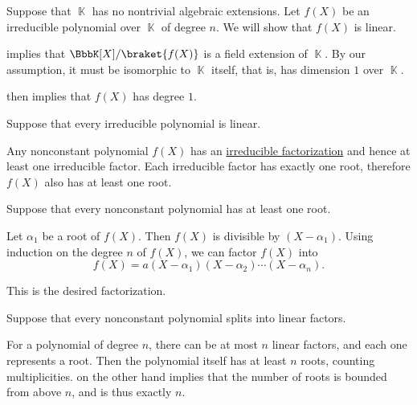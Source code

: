 \begin{defproof}
   Suppose that \( \BbbK \) has no nontrivial algebraic extensions. Let \( f(X) \) be an irreducible polynomial over \( \BbbK \) of degree \( n \). We will show that \( f(X) \) is linear.

   implies that \( \BbbK[X] / \braket{ f(X) } \) is a field extension of \( \BbbK \). By our assumption, it must be isomorphic to \( \BbbK \) itself, that is, has dimension \( 1 \) over \( \BbbK \).

   then implies that \( f(X) \) has degree \( 1 \).

   Suppose that every irreducible polynomial is linear.

  Any nonconstant polynomial \( f(X) \) has an \hyperref[def:irreducible_factorization]{irreducible factorization} and hence at least one irreducible factor. Each irreducible factor has exactly one root, therefore \( f(X) \) also has at least one root.

   Suppose that every nonconstant polynomial has at least one root.

  Let \( \alpha_1 \) be a root of \( f(X) \). Then \( f(X) \) is divisible by \( (X - \alpha_1) \). Using induction on the degree \( n \) of \( f(X) \), we can factor \( f(X) \) into
  \begin{equation*}
    f(X) = a (X - \alpha_1) (X - \alpha_2) \cdots (X - \alpha_n).
  \end{equation*}

  This is the desired factorization.

   Suppose that every nonconstant polynomial splits into linear factors.

  For a polynomial of degree \( n \), there can be at most \( n \) linear factors, and each one represents a root. Then the polynomial itself has at least \( n \) roots, counting multiplicities.  on the other hand implies that the number of roots is bounded from above \( n \), and is thus exactly \( n \).


\end{defproof}
